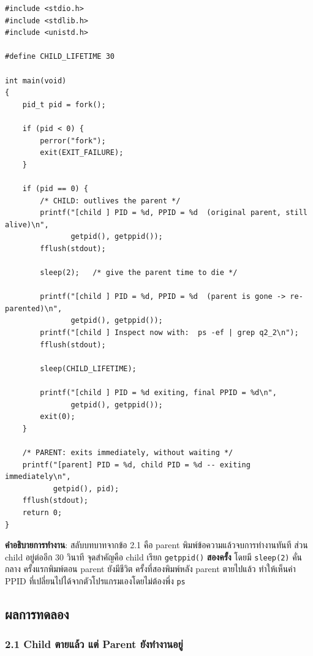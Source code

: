 \documentclass[a4paper,12pt]{article}
\newcommand{\code}[1]{\texttt{#1}}
\begin{document}
\begin{lstlisting}[caption={q2\_2\_parent\_first.c -- parent dies first, child becomes an orphan},label={lst:q2_2}]
#include <stdio.h>
#include <stdlib.h>
#include <unistd.h>

#define CHILD_LIFETIME 30

int main(void)
{
    pid_t pid = fork();

    if (pid < 0) {
        perror("fork");
        exit(EXIT_FAILURE);
    }

    if (pid == 0) {
        /* CHILD: outlives the parent */
        printf("[child ] PID = %d, PPID = %d  (original parent, still alive)\n",
               getpid(), getppid());
        fflush(stdout);

        sleep(2);   /* give the parent time to die */

        printf("[child ] PID = %d, PPID = %d  (parent is gone -> re-parented)\n",
               getpid(), getppid());
        printf("[child ] Inspect now with:  ps -ef | grep q2_2\n");
        fflush(stdout);

        sleep(CHILD_LIFETIME);

        printf("[child ] PID = %d exiting, final PPID = %d\n",
               getpid(), getppid());
        exit(0);
    }

    /* PARENT: exits immediately, without waiting */
    printf("[parent] PID = %d, child PID = %d -- exiting immediately\n",
           getpid(), pid);
    fflush(stdout);
    return 0;
}
\end{lstlisting}

\textbf{คำอธิบายการทำงาน}: สลับบทบาทจากข้อ 2.1 คือ parent พิมพ์ข้อความแล้วจบการทำงานทันที ส่วน child อยู่ต่ออีก 30 วินาที จุดสำคัญคือ child เรียก \code{getppid()} \textbf{สองครั้ง} โดยมี \code{sleep(2)} คั่นกลาง ครั้งแรกพิมพ์ตอน parent ยังมีชีวิต ครั้งที่สองพิมพ์หลัง parent ตายไปแล้ว ทำให้เห็นค่า PPID ที่เปลี่ยนไปได้จากตัวโปรแกรมเองโดยไม่ต้องพึ่ง \code{ps}

\newpage

\subsection{ผลการทดลอง}

\subsubsection{2.1 Child ตายแล้ว แต่ Parent ยังทำงานอยู่}
\end{document}

